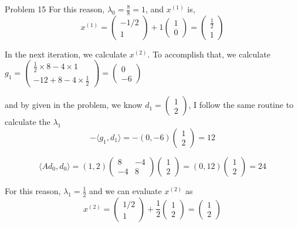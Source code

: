 \documentclass[10pt]{article}
\begin{document}
\begin{section}{Problem 15}
	For this reason, $\lambda_0 = \frac{8}{8}=1$, and $x^{(1)}$ is, 
	\[x^{(1)} = \begin{pmatrix}
	-1/2\\
	1
	\end{pmatrix} + 1 \begin{pmatrix}
	1\\
	0
	\end{pmatrix} = \begin{pmatrix}
	\frac{1}{2}\\
	1
	\end{pmatrix} \]
	
	In the next iteration, we calculate $x^{(2)}$. To accomplish that, we calculate $g_1 = \begin{pmatrix}
	\frac{1}{2} \times 8 - 4 \times 1\\
	-12 + 8 - 4 \times \frac{1}{2}
	\end{pmatrix} = \begin{pmatrix}
	0\\
	-6
	\end{pmatrix}$
	
	and by given in the problem, we know $d_1 = \begin{pmatrix}
	1\\
	2
	\end{pmatrix}$, I follow the same routine to calculate the $\lambda_1$
	\[-\langle g_1, d_1 \rangle = -(0, -6) \begin{pmatrix}
	1\\
	2
	\end{pmatrix} = 12\] 
	
	\[\langle Ad_0, d_0 \rangle  = (1,2) \begin{pmatrix}
	8 & -4\\
	-4 & 8
	\end{pmatrix} \begin{pmatrix}
	1\\
	2
	\end{pmatrix} = (0, 12) \begin{pmatrix}
	1\\
	2
	\end{pmatrix} = 24\]
	
	For this reason, $\lambda_1 = \frac{1}{2}$ and we can evaluate $x^{(2)}$ as
	\[x^{(2)} = \begin{pmatrix}
	1/2\\
	1
	\end{pmatrix} + \frac{1}{2} \begin{pmatrix}
	1\\
	2
	\end{pmatrix} = \begin{pmatrix}
	1\\
	2
	\end{pmatrix} \]
	 

\end{section}
\end{document}
